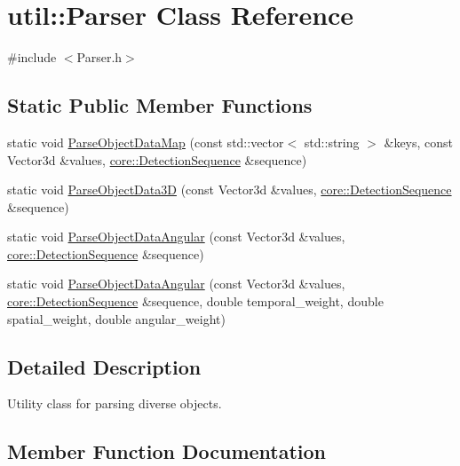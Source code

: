 \hypertarget{classutil_1_1Parser}{}\section{util\+:\+:Parser Class Reference}
\label{classutil_1_1Parser}


{\ttfamily \#include $<$Parser.\+h$>$}

\subsection*{Static Public Member Functions}
\begin{DoxyCompactItemize}
\item 
static void \hyperlink{classutil_1_1Parser_a25a262843b391df324db620205a13156}{Parse\+Object\+Data\+Map} (const std\+::vector$<$ std\+::string $>$ \&keys, const Vector3d \&values, \hyperlink{classcore_1_1DetectionSequence}{core\+::\+Detection\+Sequence} \&sequence)
\item 
static void \hyperlink{classutil_1_1Parser_a4372acb257c7c0292439f1c863287298}{Parse\+Object\+Data3D} (const Vector3d \&values, \hyperlink{classcore_1_1DetectionSequence}{core\+::\+Detection\+Sequence} \&sequence)
\item 
static void \hyperlink{classutil_1_1Parser_acad67e4a565fb4a008a2d85fa9ea215c}{Parse\+Object\+Data\+Angular} (const Vector3d \&values, \hyperlink{classcore_1_1DetectionSequence}{core\+::\+Detection\+Sequence} \&sequence)
\item 
static void \hyperlink{classutil_1_1Parser_a0f2ad399b88036840fa206704253cb56}{Parse\+Object\+Data\+Angular} (const Vector3d \&values, \hyperlink{classcore_1_1DetectionSequence}{core\+::\+Detection\+Sequence} \&sequence, double temporal\+\_\+weight, double spatial\+\_\+weight, double angular\+\_\+weight)
\end{DoxyCompactItemize}


\subsection{Detailed Description}
Utility class for parsing diverse objects. 

\subsection{Member Function Documentation}
